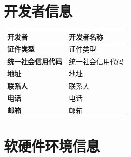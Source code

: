 \documentclass[a4paper,12pt]{article}
\begin{document}


\section{开发者信息}

\begin{center}
\begin{tabularx}{\textwidth}{|l|L|}
\hline
\textbf{开发者} & {{开发者名称}} \\
\hline
\textbf{证件类型} & {{证件类型}} \\
\hline
\textbf{统一社会信用代码} & {{统一社会信用代码}} \\
\hline
\textbf{地址} & {{地址}} \\
\hline
\textbf{联系人} & {{联系人}} \\
\hline
\textbf{电话} & {{电话}} \\
\hline
\textbf{邮箱} & {{邮箱}} \\
\hline
\end{tabularx}
\end{center}


\section{软硬件环境信息}
\end{document}
